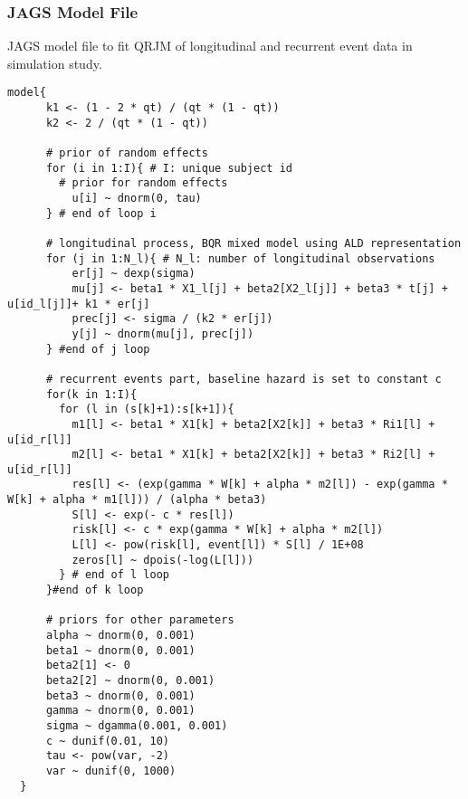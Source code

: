 \subsubsection{\textsf{JAGS} Model File}
\textsf{JAGS} model file to fit QRJM of longitudinal and recurrent event data in simulation study.
{\scriptsize
\begin{verbatim}
model{
      k1 <- (1 - 2 * qt) / (qt * (1 - qt))
      k2 <- 2 / (qt * (1 - qt))

      # prior of random effects
      for (i in 1:I){ # I: unique subject id
        # prior for random effects
          u[i] ~ dnorm(0, tau)
      } # end of loop i

      # longitudinal process, BQR mixed model using ALD representation
      for (j in 1:N_l){ # N_l: number of longitudinal observations
          er[j] ~ dexp(sigma)
          mu[j] <- beta1 * X1_l[j] + beta2[X2_l[j]] + beta3 * t[j] + u[id_l[j]]+ k1 * er[j]
          prec[j] <- sigma / (k2 * er[j])
          y[j] ~ dnorm(mu[j], prec[j])
      } #end of j loop

      # recurrent events part, baseline hazard is set to constant c
      for(k in 1:I){
        for (l in (s[k]+1):s[k+1]){
          m1[l] <- beta1 * X1[k] + beta2[X2[k]] + beta3 * Ri1[l] + u[id_r[l]]
          m2[l] <- beta1 * X1[k] + beta2[X2[k]] + beta3 * Ri2[l] + u[id_r[l]]
          res[l] <- (exp(gamma * W[k] + alpha * m2[l]) - exp(gamma * W[k] + alpha * m1[l])) / (alpha * beta3)
          S[l] <- exp(- c * res[l])
          risk[l] <- c * exp(gamma * W[k] + alpha * m2[l])
          L[l] <- pow(risk[l], event[l]) * S[l] / 1E+08
          zeros[l] ~ dpois(-log(L[l]))
        } # end of l loop
      }#end of k loop

      # priors for other parameters
      alpha ~ dnorm(0, 0.001)
      beta1 ~ dnorm(0, 0.001)
      beta2[1] <- 0
      beta2[2] ~ dnorm(0, 0.001)
      beta3 ~ dnorm(0, 0.001)
      gamma ~ dnorm(0, 0.001)
      sigma ~ dgamma(0.001, 0.001)
      c ~ dunif(0.01, 10)
      tau <- pow(var, -2)
      var ~ dunif(0, 1000)
  }
\end{verbatim}
}